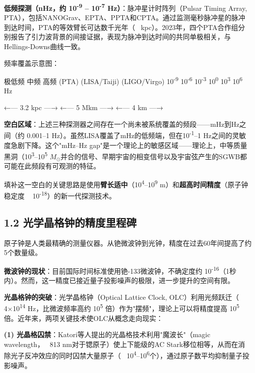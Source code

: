 \documentclass[12pt,a4paper]{article}
\begin{document}
\textbf{低频探测（nHz，约 10\textsuperscript{-9} – 10\textsuperscript{-7} Hz）}：脉冲星计时阵列（Pulsar Timing Array, PTA），包括NANOGrav、EPTA、PPTA和CPTA。通过监测毫秒脉冲星的脉冲到达时间，PTA的等效臂长可达数千光年（~ kpc）。2023年，四个PTA合作组分别报告了引力波背景的间接证据，表现为脉冲到达时间的共同单极相关，与Hellings-Downs曲线一致\cite{ref4}。

频率覆盖示意图：

极低频          中频             高频
(PTA)         (LISA/Taiji)     (LIGO/Virgo)
10\textsuperscript{-9}    10\textsuperscript{-6}    10\textsuperscript{-3}     10\textsuperscript{0}     10\textsuperscript{3}    10\textsuperscript{6} Hz

←--- 3.2 kpc ---→  ←--- 5 Mkm ---→  ←--- 4 km ---→

\textbf{空白区域}：上述三种探测器之间存在一个尚未被系统覆盖的频段——mHz到Hz之间（约 0.001–1 Hz）。虽然LISA覆盖了mHz的低频端，但在10\textsuperscript{-1}–1 Hz之间的灵敏度急剧下降。这个"mHz–Hz gap"是一个理论上的敏感区域——理论上，中等质量黑洞（10\textsuperscript{3}–10\textsuperscript{5} $M_{\odot}$并合的信号、早期宇宙的相变信号以及宇宙弦产生的SGWB都可能在此频段有可观测的特征。

填补这一空白的关键思路是使用\textbf{臂长适中}（10\textsuperscript{4}–10\textsuperscript{9} m）和\textbf{超高时间精度}（原子钟稳定度 ~ 10\textsuperscript{-18}）的新一代探测技术。

\subsection{1.2 光学晶格钟的精度里程碑}


原子钟是人类最精确的测量仪器。从铯微波钟到光钟，精度在过去60年间提高了约5个数量级。

\textbf{微波钟的现状}：目前国际时间标准使用铯-133微波钟，不确定度约 10\textsuperscript{-16}（1秒内）。然而，这一精度已接近量子投影噪声的极限，进一步提升的空间有限。

\textbf{光晶格钟的突破}：光学晶格钟（Optical Lattice Clock, OLC）利用光频跃迁（~ 4×10\textsuperscript{14} Hz，比微波频率高约 10\textsuperscript{5} 倍）作为"摆频"，理论上可以将精度提高 10\textsuperscript{5} 倍。近年来，两项关键技术使OLC从概念走向现实：

\textbf{(1) 光晶格囚禁}：Katori等人提出的光晶格技术利用"魔波长"（magic wavelength，~ 813 nm对于锶原子）使上下能级的AC Stark移位相等，从而在消除光子反冲效应的同时囚禁大量原子（~ 10\textsuperscript{4}–10\textsuperscript{6}个），通过原子数平均抑制量子投影噪声\cite{ref5}。
\end{document}
